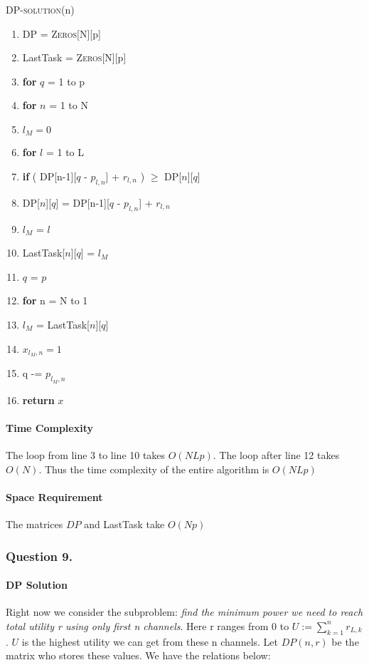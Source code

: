 \documentclass[11pt, oneside]{report}
\begin{document}
\noindent\textsc{DP-solution}(n)
\begin{enumerate}[1\ ]
\setlength{\topsep}{0.05ex}
\setlength{\itemsep}{0.05ex}
\item DP = \textsc{Zeros}[N][p]
\item LastTask = \textsc{Zeros}[N][p]
\item \textbf{for} $q$ = 1 to p
\item \qquad \textbf{for} $n$ = 1 to N
\item \qquad \qquad $l_M = 0$
\item \qquad \qquad \textbf{for} $l$ = 1 to L
\item \qquad \qquad \qquad \textbf{if} ( DP[n-1][$q$ - $p_{l,n}$] + $r_{l,n}$ ) $\geq$ DP[$n$][$q$]
\item \qquad \qquad \qquad \qquad DP[$n$][$q$] = DP[n-1][$q$ - $p_{l,n}$] + $r_{l,n}$
\item \qquad \qquad \qquad \qquad $l_M$ = $l$
\item \qquad \qquad LastTask[$n$][$q$] = $l_M$
\item $q$ = $p$
\item \textbf{for} n = N to 1
\item \qquad $l_M$ = LastTask[$n$][$q$]
\item \qquad $x_{l_M, n} = 1$
\item \qquad q -= $p_{l_M, n}$
\item \textbf{return} $x$
\end{enumerate}

\paragraph{Time Complexity} The loop from line 3 to line 10 takes $O(NLp)$. The loop after line 12 takes $O(N)$. Thus the time complexity of the entire algorithm is $O(NLp)$
\paragraph{Space Requirement} The matrices $DP$ and LastTask take $O(Np)$

\subsubsection{Question 9. }
\paragraph{DP Solution} Right now we consider the subproblem: \textit{find the minimum power we need to reach total utility r using only first n channels}. Here r ranges from $0$ to $U := \sum_{k = 1}^{n} r_{L,k}$. $U$ is the highest utility we can get from these n channels. Let $DP(n,r)$ be the matrix who stores these values. We have the relations below:
\end{document}
